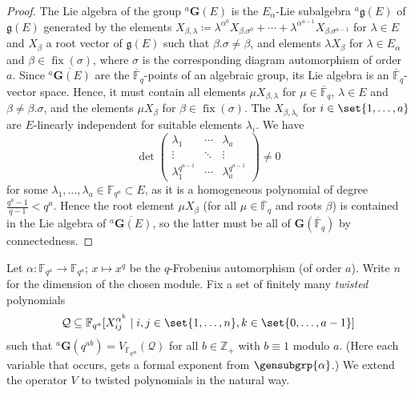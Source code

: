 \documentclass[a4paper,12pt]{amsproc}
\DeclareMathOperator{\fix}{fix}%
\theoremstyle{plain}
\theoremstyle{definition}
\begin{document}
\begin{proof}
The Lie algebra of the group ${}^a\mathbf{G}(E)$ is the $E_\alpha$-Lie subalgebra ${}^a\mathfrak{g}(E)$ of $\mathfrak{g}(E)$ generated by the elements $X_{\beta,\lambda}\coloneqq\lambda^{\alpha^0} X_{\beta.\sigma^0}+\cdots+\lambda^{\alpha^{a-1}}X_{\beta.\sigma^{a-1}}$ for $\lambda\in E$ and $X_\beta$ a root vector of $\mathfrak{g}(E)$ such that $\beta.\sigma\neq\beta$, and elements $\lambda X_\beta$ for $\lambda\in E_\alpha$ and $\beta\in\fix(\sigma)$, where $\sigma$ is the corresponding diagram automorphism of order $a$. Since $\overline{{}^a\mathbf{G}(E)}$ are the $\overline{\mathbb{F}}_q$-points of an algebraic group, its Lie algebra is an $\overline{\mathbb{F}}_q$-vector space. Hence, it must contain all elements $\mu X_{\beta,\lambda}$ for $\mu\in\overline{\mathbb{F}}_q$, $\lambda\in E$ and $\beta\neq\beta.\sigma$, and the elements $\mu X_\beta$ for $\beta\in\fix(\sigma)$.
The $X_{\beta,\lambda_i}$ for $i\in\set{1,\ldots,a}$ are $E$-linearly independent for suitable elements $\lambda_i$. We have
$$
\det\begin{pmatrix}
\lambda_1 & \cdots &\lambda_a\\
\vdots & \ddots & \vdots\\
\lambda_1^{q^{a-1}} & \cdots & \lambda_a^{q^{a-1}}
\end{pmatrix}\neq 0
$$
for some $\lambda_1,\ldots,\lambda_a\in\mathbb{F}_{q^a}\subset E$, as it is a homogeneous polynomial of degree $\frac{q^a-1}{q-1}<q^a$.
Hence the root element $\mu X_\beta$ (for all $\mu\in\overline{\mathbb{F}}_q$ and roots $\beta$) is contained in the Lie algebra of $\overline{{}^a\mathbf{G}(E)}$, so the latter must be all of $\mathbf{G}(\overline{\mathbb{F}}_q)$ by connectedness.
\end{proof}

Let $\alpha\colon\mathbb{F}_{q^a}\to\mathbb{F}_{q^a}$; $x\mapsto x^q$ be the $q$-Frobenius automorphism (of order $a$). Write $n$ for the dimension of the chosen module. Fix a set of finitely many \emph{twisted} polynomials
$$
\mathcal{Q}\subseteq \mathbb{F}_{q^a}[X_{ij}^{\alpha^k}\mid i,j\in\set{1,\ldots,n}, k\in\set{0,\ldots,a-1}]
$$ 
such that ${}^a\mathbf{G}(q^{ab})=V_{\mathbb{F}_{q^{ab}}}(\mathcal{Q})$ for all $b\in\mathbb{Z}_+$ with $b\equiv 1$ modulo $a$. (Here each variable that occurs, gets a formal exponent from $\gensubgrp{\alpha}$.) We extend the operator $V$ to twisted polynomials in the natural way.
	
\end{document}
